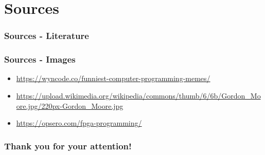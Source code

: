 \documentclass{beamer}
\begin{document}
\section{Sources}
\begin{frame}
	\frametitle{Sources - Literature}
\end{frame}

\begin{frame}
\frametitle{Sources - Images}
\begin{itemize}
	\item \url{https://wyncode.co/funniest-computer-programming-memes/}
	\item \url{https://upload.wikimedia.org/wikipedia/commons/thumb/6/6b/Gordon_Moore.jpg/220px-Gordon_Moore.jpg}
	\item \url{https://opsero.com/fpga-programming/}
\end{itemize}
\end{frame}
\begin{frame}
    \frametitle{Thank you for your attention!}
\end{frame}
\end{document}
